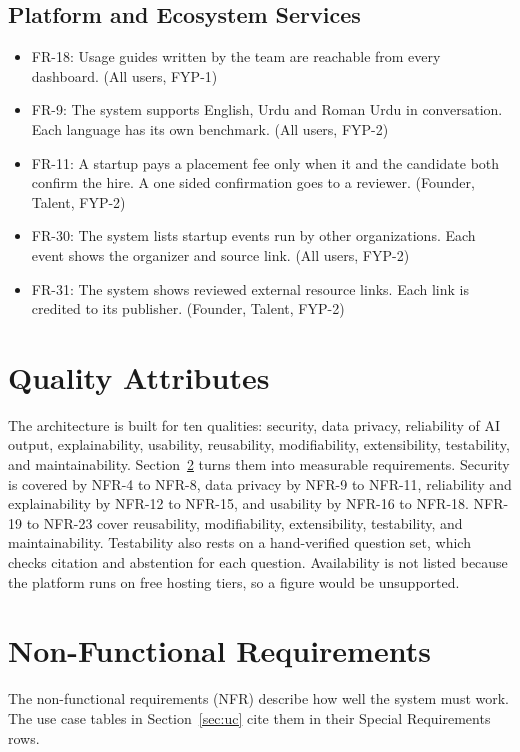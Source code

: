 \documentclass{FastFyp}
\begin{document}
\subsection{Platform and Ecosystem Services}
\begin{itemize}
\item FR-18: Usage guides written by the team are reachable from every dashboard. (All users, FYP-1)
\item FR-9: The system supports English, Urdu and Roman Urdu in conversation. Each language has its own benchmark. (All users, FYP-2)
\item FR-11: A startup pays a placement fee only when it and the candidate both confirm the hire. A one sided confirmation goes to a reviewer. (Founder, Talent, FYP-2)
\item FR-30: The system lists startup events run by other organizations. Each event shows the organizer and source link. (All users, FYP-2)
\item FR-31: The system shows reviewed external resource links. Each link is credited to its publisher. (Founder, Talent, FYP-2)
\end{itemize}

\section{Quality Attributes}
The architecture is built for ten qualities: security, data privacy, reliability of AI output, explainability, usability, reusability, modifiability, extensibility, testability, and maintainability. Section~\ref{sec:nfr} turns them into measurable requirements. Security is covered by NFR-4 to NFR-8, data privacy by NFR-9 to NFR-11, reliability and explainability by NFR-12 to NFR-15, and usability by NFR-16 to NFR-18. NFR-19 to NFR-23 cover reusability, modifiability, extensibility, testability, and maintainability. Testability also rests on a hand-verified question set, which checks citation and abstention for each question. Availability is not listed because the platform runs on free hosting tiers, so a figure would be unsupported.

\section{Non-Functional Requirements}\label{sec:nfr}
The non-functional requirements (NFR) describe how well the system must work. The use case tables in Section~\ref{sec:uc} cite them in their Special Requirements rows.
\end{document}
